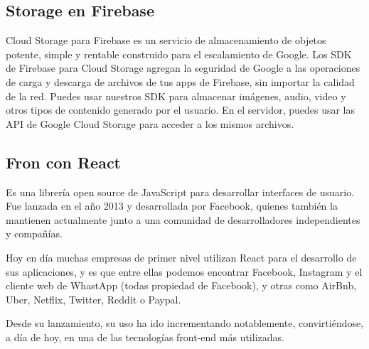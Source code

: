 \documentclass{article}
\begin{document}
 \subsection{Storage en Firebase}
 
 Cloud Storage para Firebase es un servicio de almacenamiento de objetos potente, simple y rentable construido para el escalamiento de Google. Los SDK de Firebase para Cloud Storage agregan la seguridad de Google a las operaciones de carga y descarga de archivos de tus apps de Firebase, sin importar la calidad de la red.
Puedes usar nuestros SDK para almacenar imágenes, audio, video y otros tipos de contenido generado por el usuario. En el servidor, puedes usar las API de Google Cloud Storage para acceder a los mismos archivos.


\subsection{Fron con React}
Es una librería open source de JavaScript para desarrollar interfaces de usuario. Fue lanzada en el año 2013 y desarrollada por Facebook, quienes también la mantienen actualmente junto a una comunidad de desarrolladores independientes y compañías.

Hoy en día muchas empresas de primer nivel utilizan React para el desarrollo de sus aplicaciones, y es que entre ellas podemos encontrar Facebook, Instagram y el cliente web de WhastApp (todas propiedad de Facebook), y otras como AirBnb, Uber, Netflix, Twitter, Reddit o Paypal.

Desde su lanzamiento, su uso ha ido incrementando notablemente, convirtiéndose, a día de hoy, en una de las tecnologías front-end más utilizadas.
\end{document}

